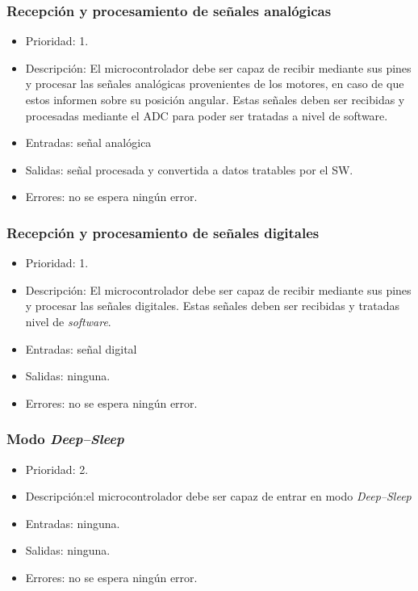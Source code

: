 \subsubsection{Recepción y procesamiento de señales analógicas}
\begin{itemize}
    \item Prioridad: 1.
    \item Descripción: El microcontrolador debe ser capaz de recibir mediante sus pines y procesar las señales analógicas provenientes de los motores, en caso de que estos informen sobre su posición angular. Estas señales deben ser recibidas y procesadas mediante el \ac{ADC} para poder ser tratadas a nivel de software.
    \item Entradas: señal analógica
    \item Salidas: señal procesada y convertida a datos tratables por el \ac{SW}.
    \item Errores: no se espera ningún error.
    \end{itemize}
    
\subsubsection{Recepción y procesamiento de señales digitales}
\begin{itemize}
    \item Prioridad: 1.
    \item Descripción: El microcontrolador debe ser capaz de recibir mediante sus pines y procesar las señales digitales. Estas señales deben ser recibidas y tratadas nivel de \textit{software}.
    \item Entradas: señal digital
    \item Salidas: ninguna.
    \item Errores: no se espera ningún error.    
\end{itemize}

\subsubsection{Modo \textit{Deep--Sleep}}
\begin{itemize}
    \item Prioridad: 2.
    \item Descripción:el microcontrolador debe ser capaz de entrar en modo \textit{Deep--Sleep}
    \item Entradas: ninguna.
    \item Salidas: ninguna.
    \item Errores: no se espera ningún error.
\end{itemize}

